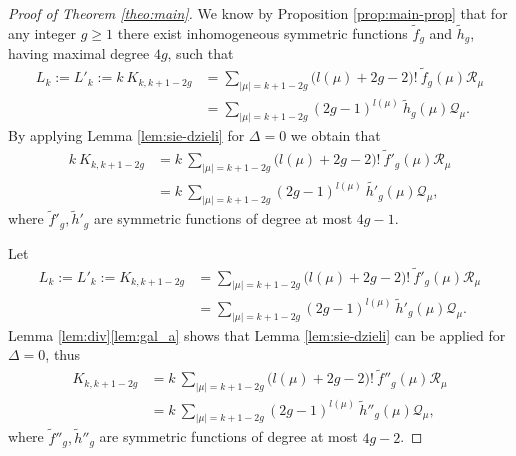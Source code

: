 \documentclass[12pt]{amsart}
\theoremstyle{plain}
\theoremstyle{remark}
\begin{document}
\begin{proof}[Proof of Theorem \ref{theo:main}]
We know by Proposition \ref{prop:main-prop} that for any integer $g\geq 1$ there
exist inhomogeneous symmetric
functions $\tilde{f}_g$ and $\tilde{h}_g$, having maximal degree $4g$, such
that
\begin{align*}
L_k := L'_k := k\ K_{k,k+1-2g} &=  \sum_{|\mu|=k+1-2g}
\big(l(\mu) + 2g - 2\big)! \ \tilde{f}_g(\mu) \mathcal{R}_\mu \\ 
 &= \sum_{|\mu|=k+1-2g}
(2g - 1)^{l(\mu)}\ \tilde{h}_g(\mu) \mathcal{Q}_\mu.
\end{align*}
By applying Lemma \ref{lem:sie-dzieli} for $\Delta=0$ we obtain that
\begin{align*}
k\ K_{k,k+1-2g} &=  k\ \sum_{|\mu|=k+1-2g}
\big(l(\mu) + 2g - 2\big)! \ \tilde{f}'_g(\mu) \mathcal{R}_\mu \\ 
 &= k\ \sum_{|\mu|=k+1-2g}
(2g - 1)^{l(\mu)}\ \tilde{h'}_g(\mu) \mathcal{Q}_\mu,
\end{align*}
where $\tilde{f}'_g, \tilde{h}'_g$ are symmetric functions of degree at most
$4g-1$.

Let 
\begin{align*}
L_k := L'_k := K_{k,k+1-2g} &=  \sum_{|\mu|=k+1-2g}
\big(l(\mu) + 2g - 2\big)! \ \tilde{f}'_g(\mu) \mathcal{R}_\mu \\ 
 &= \sum_{|\mu|=k+1-2g}
(2g - 1)^{l(\mu)}\ \tilde{h}'_g(\mu) \mathcal{Q}_\mu.
\end{align*}
Lemma \ref{lem:div}\ref{lem:gal_a} shows that Lemma \ref{lem:sie-dzieli} can be applied for
$\Delta=0$, thus
\begin{align*}
K_{k,k+1-2g} &=  k\ \sum_{|\mu|=k+1-2g}
\big(l(\mu) + 2g - 2\big)! \ \tilde{f}''_g(\mu) \mathcal{R}_\mu \\ 
 &= k\ \sum_{|\mu|=k+1-2g}
(2g - 1)^{l(\mu)}\ \tilde{h}''_g(\mu) \mathcal{Q}_\mu,
\end{align*}
where $\tilde{f}''_g, \tilde{h}''_g$ are symmetric functions of degree at most
$4g-2$.


\end{proof}
\end{document}
